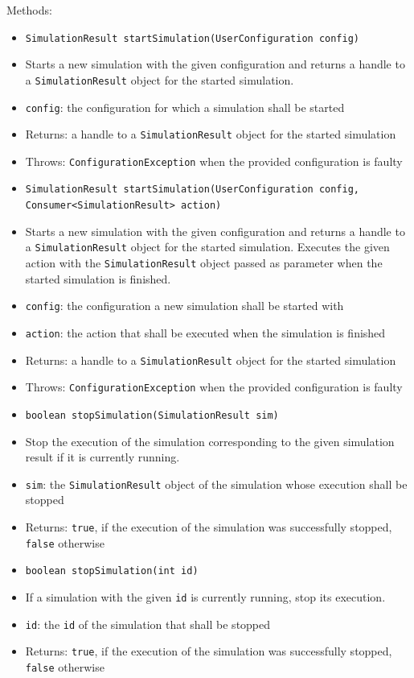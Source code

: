 \documentclass[parskip=full,11pt]{scrartcl}
\begin{document}
Methods:
\begin{itemize} \itemsep -10pt
	\item \texttt{SimulationResult startSimulation(UserConfiguration config)}
	\item[] Starts a new simulation with the given configuration and returns a handle to a \texttt{SimulationResult} object for the started simulation.
	\item[]\texttt{config}: the configuration for which a simulation shall be started
	\item[] Returns: a handle to a \texttt{SimulationResult} object for the started simulation
	\item[] Throws: \texttt{ConfigurationException} when the provided configuration is faulty

	\item \texttt{SimulationResult startSimulation(UserConfiguration config, Consumer<SimulationResult> action)}
	\item[] Starts a new simulation with the given configuration and returns a handle to a \texttt{SimulationResult} object for the started simulation. Executes the given action with the \texttt{SimulationResult} object passed as parameter when the started simulation is finished.
	\item[] \texttt{config}: the configuration a new simulation shall be started with
	\item[] \texttt{action}: the action that shall be executed when the simulation is finished
	\item[] Returns: a handle to a \texttt{SimulationResult} object for the started simulation
	\item[] Throws: \texttt{ConfigurationException} when the provided configuration is faulty

	\item \texttt{boolean stopSimulation(SimulationResult sim)}
	\item[] Stop the execution of the simulation corresponding to the given simulation result if it is currently running.
	\item[] \texttt{sim}: the \texttt{SimulationResult} object of the simulation whose execution shall be stopped
	\item[] Returns: \texttt{true}, if the execution of the simulation was successfully stopped, \texttt{false} otherwise

	\item \texttt{boolean stopSimulation(int id)}
	\item[] If a simulation with the given \texttt{id} is currently running, stop its execution.
	\item[] \texttt{id}: the \texttt{id} of the simulation that shall be stopped
	\item[] Returns: \texttt{true}, if the execution of the simulation was successfully stopped, \texttt{false} otherwise


\end{itemize}
\end{document}
